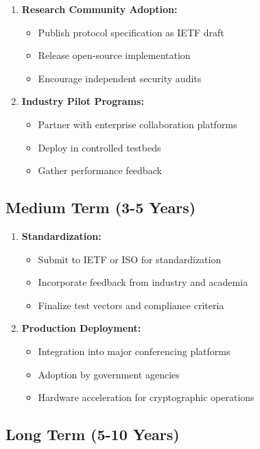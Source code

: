 \documentclass[12pt,a4paper]{report}
\begin{document}
\begin{enumerate}
\item \textbf{Research Community Adoption:}
\begin{itemize}
\item Publish protocol specification as IETF draft
\item Release open-source implementation
\item Encourage independent security audits
\end{itemize}

\item \textbf{Industry Pilot Programs:}
\begin{itemize}
\item Partner with enterprise collaboration platforms
\item Deploy in controlled testbeds
\item Gather performance feedback
\end{itemize}
\end{enumerate}

\subsection{Medium Term (3-5 Years)}

\begin{enumerate}
\item \textbf{Standardization:}
\begin{itemize}
\item Submit to IETF or ISO for standardization
\item Incorporate feedback from industry and academia
\item Finalize test vectors and compliance criteria
\end{itemize}

\item \textbf{Production Deployment:}
\begin{itemize}
\item Integration into major conferencing platforms
\item Adoption by government agencies
\item Hardware acceleration for cryptographic operations
\end{itemize}
\end{enumerate}

\subsection{Long Term (5-10 Years)}
\end{document}
